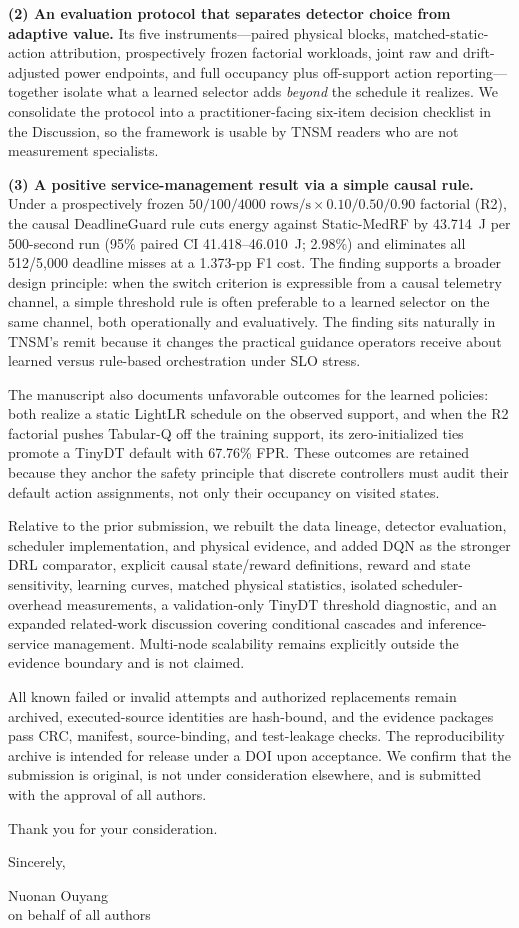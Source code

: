 \documentclass[11pt]{article}
\begin{document}
\textbf{(2) An evaluation protocol that separates detector choice from adaptive value.} Its five instruments---paired physical blocks, matched-static-action attribution, prospectively frozen factorial workloads, joint raw and drift-adjusted power endpoints, and full occupancy plus off-support action reporting---together isolate what a learned selector adds \emph{beyond} the schedule it realizes. We consolidate the protocol into a practitioner-facing six-item decision checklist in the Discussion, so the framework is usable by TNSM readers who are not measurement specialists.

\textbf{(3) A positive service-management result via a simple causal rule.} Under a prospectively frozen $50/100/4000\text{ rows/s}\times 0.10/0.50/0.90$ factorial (R2), the causal DeadlineGuard rule cuts energy against Static-MedRF by 43.714~J per 500-second run (95\% paired CI 41.418--46.010~J; 2.98\%) and eliminates all 512/5,000 deadline misses at a 1.373-pp F1 cost. The finding supports a broader design principle: when the switch criterion is expressible from a causal telemetry channel, a simple threshold rule is often preferable to a learned selector on the same channel, both operationally and evaluatively. The finding sits naturally in TNSM's remit because it changes the practical guidance operators receive about learned versus rule-based orchestration under SLO stress.

The manuscript also documents unfavorable outcomes for the learned policies: both realize a static LightLR schedule on the observed support, and when the R2 factorial pushes Tabular-Q off the training support, its zero-initialized ties promote a TinyDT default with 67.76\% FPR. These outcomes are retained because they anchor the safety principle that discrete controllers must audit their default action assignments, not only their occupancy on visited states.

Relative to the prior submission, we rebuilt the data lineage, detector evaluation, scheduler implementation, and physical evidence, and added DQN as the stronger DRL comparator, explicit causal state/reward definitions, reward and state sensitivity, learning curves, matched physical statistics, isolated scheduler-overhead measurements, a validation-only TinyDT threshold diagnostic, and an expanded related-work discussion covering conditional cascades and inference-service management. Multi-node scalability remains explicitly outside the evidence boundary and is not claimed.

All known failed or invalid attempts and authorized replacements remain archived, executed-source identities are hash-bound, and the evidence packages pass CRC, manifest, source-binding, and test-leakage checks. The reproducibility archive is intended for release under a DOI upon acceptance. We confirm that the submission is original, is not under consideration elsewhere, and is submitted with the approval of all authors.

Thank you for your consideration.

\vspace{18pt}
Sincerely,

\vspace{34pt}
Nuonan Ouyang\\
on behalf of all authors
\end{document}
